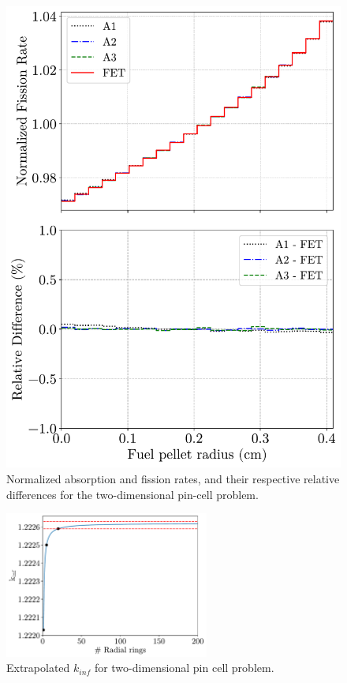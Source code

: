 \begin{figure}
\begin{minipage}{.51\textwidth}
      \includegraphics[width=\textwidth]{figs/pin_2d_fiss.pdf}
    \end{minipage}
    \caption[Normalized absorption and fission rates]{Normalized absorption and fission rates, and their respective relative differences for the two-dimensional pin-cell problem.}
    \label{fig_42}
\end{figure}

\begin{figure}
    \centering
    \includegraphics[width=0.6\textwidth]{figs/k_inf.pdf}
    \caption{Extrapolated $k_{inf}$ for two-dimensional pin cell problem.}
    \label{fig_43}
\end{figure}

